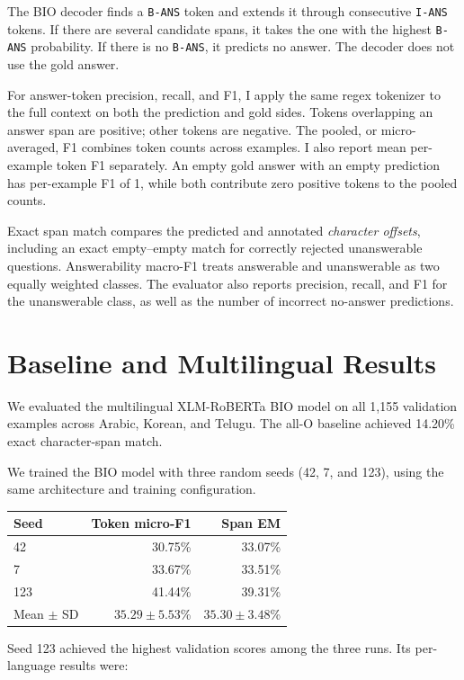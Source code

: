 \documentclass[a4paper,11pt]{article}
\begin{document}
The BIO decoder finds a \texttt{B-ANS} token and extends it through consecutive \texttt{I-ANS} tokens. If there are several candidate spans, it takes the one with the highest \texttt{B-ANS} probability. If there is no \texttt{B-ANS}, it predicts no answer. The decoder does not use the gold answer.

For answer-token precision, recall, and F1, I apply the same regex tokenizer to the full context on both the prediction and gold sides. Tokens overlapping an answer span are positive; other tokens are negative. The pooled, or micro-averaged, F1 combines token counts across examples. I also report mean per-example token F1 separately. An empty gold answer with an empty prediction has per-example F1 of 1, while both contribute zero positive tokens to the pooled counts.

Exact span match compares the predicted and annotated \emph{character offsets}, including an exact empty--empty match for correctly rejected unanswerable questions. Answerability macro-F1 treats answerable and unanswerable as two equally weighted classes. The evaluator also reports precision, recall, and F1 for the unanswerable class, as well as the number of incorrect no-answer predictions.


\section{Baseline and Multilingual Results}

We evaluated the multilingual XLM-RoBERTa BIO model on
all 1,155 validation examples across Arabic, Korean,
and Telugu. The all-O baseline achieved 14.20\% exact
character-span match.

We trained the BIO model with three random seeds
(42, 7, and 123), using the same architecture and
training configuration.

\begin{center}
\small
\begin{tabular}{lrr}
\hline
Seed & Token micro-F1 & Span EM \\
\hline
42  & 30.75\% & 33.07\% \\
7   & 33.67\% & 33.51\% \\
123 & 41.44\% & 39.31\% \\
\hline
Mean $\pm$ SD
& $35.29 \pm 5.53$\%
& $35.30 \pm 3.48$\% \\
\hline
\end{tabular}
\end{center}

Seed 123 achieved the highest validation scores among
the three runs. Its per-language results were:
\end{document}
